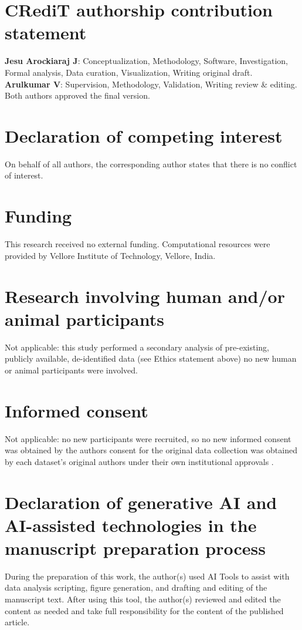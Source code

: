 \documentclass[3p,final,10pt]{elsarticle}
\let\oldsection\section
\renewcommand{\section}{\FloatBarrier\oldsection}
\begin{document}
\section*{CRediT authorship contribution statement}
\textbf{Jesu Arockiaraj J}: Conceptualization, Methodology, Software,
Investigation, Formal analysis, Data curation, Visualization, Writing
original draft. 
\textbf{Arulkumar V}: Supervision, Methodology,
Validation, Writing  review \& editing. Both authors approved the final
version.

\section*{Declaration of competing interest}
On behalf of all
authors, the corresponding author states that there is no conflict of interest.
\section*{Funding}
This research received no external funding. Computational resources were
provided by Vellore Institute of Technology, Vellore, India.

\section*{Research involving human and/or animal participants}
Not applicable: this study performed a secondary analysis of pre-existing,
publicly available, de-identified data (see Ethics statement above) no
new human or animal participants were involved.

\section*{Informed consent}
Not applicable: no new participants were recruited, so no new informed
consent was obtained by the authors consent for the original data
collection was obtained by each dataset's original authors under their
own institutional approvals \cite{pereira2015,zham2017}.

\section*{Declaration of generative AI and AI-assisted technologies in the manuscript preparation process}
During the preparation of this work, the author(s) used AI Tools
to assist with data analysis scripting, figure generation, and drafting and
editing of the manuscript text. After using this tool, the author(s)
reviewed and edited the content as needed and take full responsibility for
the content of the published article.
\end{document}
